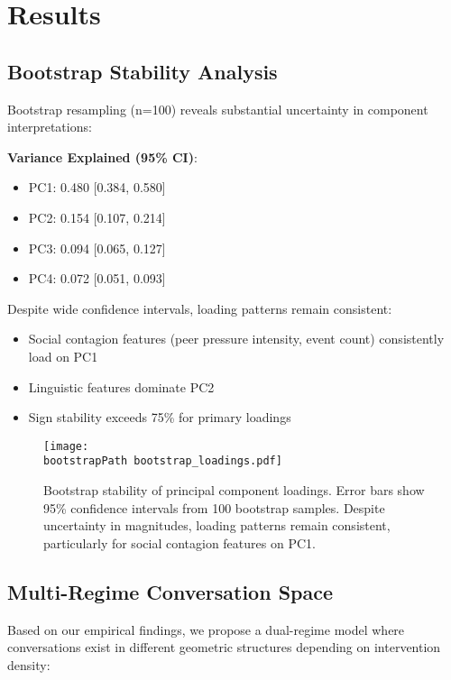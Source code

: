 \documentclass[11pt,letterpaper]{article}
\newcommand{\pcOneVarianceMean}{0.480}
\newcommand{\pcOneVarianceCI}{[0.384, 0.580]}
\newcommand{\pcTwoVarianceMean}{0.154}
\newcommand{\pcTwoVarianceCI}{[0.107, 0.214]}
\newcommand{\pcThreeVarianceMean}{0.094}
\newcommand{\pcThreeVarianceCI}{[0.065, 0.127]}
\newcommand{\pcFourVarianceMean}{0.072}
\newcommand{\pcFourVarianceCI}{[0.051, 0.093]}
\newcommand{\bootstrapSamples}{100}
\newcommand{\bootstrapPath}{../analysis/rigorous_analysis_outputs/bootstrap/}
\begin{document}
\section{Results}

\subsection{Bootstrap Stability Analysis}

Bootstrap resampling (n=\bootstrapSamples{}) reveals substantial uncertainty in component interpretations:

\textbf{Variance Explained (95\% CI)}:
\begin{itemize}
    \item PC1: \pcOneVarianceMean{} \pcOneVarianceCI{}
    \item PC2: \pcTwoVarianceMean{} \pcTwoVarianceCI{}
    \item PC3: \pcThreeVarianceMean{} \pcThreeVarianceCI{}
    \item PC4: \pcFourVarianceMean{} \pcFourVarianceCI{}
\end{itemize}

Despite wide confidence intervals, loading patterns remain consistent:
\begin{itemize}
    \item Social contagion features (peer pressure intensity, event count) consistently load on PC1
    \item Linguistic features dominate PC2
    \item Sign stability exceeds 75\% for primary loadings
\end{itemize}

\begin{figure}[htbp]
\centering
\texttt{[image: \\bootstrapPath bootstrap\_loadings.pdf]}
\caption{Bootstrap stability of principal component loadings. Error bars show 95\% confidence intervals from \bootstrapSamples{} bootstrap samples. Despite uncertainty in magnitudes, loading patterns remain consistent, particularly for social contagion features on PC1.}
\label{fig:bootstrap_loadings}
\end{figure}

\subsection{Multi-Regime Conversation Space}

Based on our empirical findings, we propose a dual-regime model where conversations exist in different geometric structures depending on intervention density:
\end{document}
